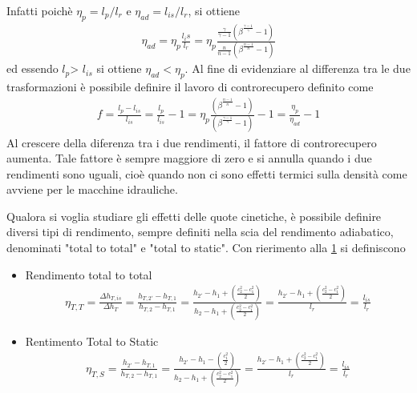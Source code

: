 \begin{figure}
\begin{minipage}{.55\textwidth}
  \label{fig:Rend4}
\end{minipage}
\end{figure}
Infatti poichè $\eta_p = l_p / l_r$ e $\eta_{ad} = l_{is} / l_r$, si ottiene
\begin{align*}
\eta_{ad} = \eta_p \frac{l_is}{l_r} = \eta_p \frac{\frac{\gamma}{\gamma-1} \left(\beta^{\frac{\gamma -1}{\gamma}}-1 \right)}{\frac{n}{n-1} \left(\beta^{\frac{n -1}{n}}-1 \right)}
\end{align*}
ed essendo $l_p$> $l_{is}$ si ottiene $\eta_{ad} < \eta_p$. Al fine di evidenziare al differenza tra le due trasformazioni è possibile definire il lavoro di controrecupero definito come
\begin{align*}
f = \frac{l_p - l_{is}}{l_{is}} = \frac{l_p}{l_{is}} -1 = \eta_p \frac{\left( \beta^{\frac{n-1}{n}} -1 \right)}{\left( \beta^{\frac{\gamma-1}{\gamma}} -1 \right)} -1 = \frac{\eta_p}{\eta_{ad}} -1
\end{align*}
Al crescere della diferenza tra i due rendimenti, il fattore di controrecupero aumenta. Tale fattore è sempre maggiore di zero e si annulla quando i due rendimenti sono uguali, cioè quando non ci sono effetti termici sulla densità come avviene per le macchine idrauliche.

Qualora si voglia studiare gli effetti delle quote cinetiche, è possibile definire diversi tipi di rendimento, sempre definiti nella scia del rendimento adiabatico, denominati "total to total" e "total to static". Con rierimento alla \ref{fig:Rend4} si definiscono
\begin{itemize}
\item Rendimento total to total
\begin{align*}
\eta_{T,T} = \frac{\Delta h_{T,is}}{\Delta h_T} = \frac{h_{T,2'} - h_{T,1}}{h_{T,2} - h_{T,1}} = \frac{h_{2'} - h_1 + \left( \frac{c_2^2 - c_1^2}{2} \right)}{h_2 - h_1 + \left( \frac{c_2^2 - c_1^2}{2} \right)} = \frac{h_{2'} - h_1 + \left( \frac{c_2^2 - c_1^2}{2} \right)}{l_r} = \frac{l_{is}}{l_r}
\end{align*}
\item Rentimento Total to Static
\begin{align*}
\eta_{T,S} = \frac{h_{2'} - h_{T,1}}{h_{T,2} - h_{T,1}} = \frac{h_{2'} - h_1 - \left( \frac{ c_1^2}{2} \right)}{h_2 - h_1 + \left( \frac{c_2^2 - c_1^2}{2} \right)} = \frac{h_{2'} - h_1 + \left( \frac{c_2^2 - c_1^2}{2} \right)}{l_r} = \frac{l_{is}}{l_r}
\end{align*}
\end{itemize}
\pagebreak
